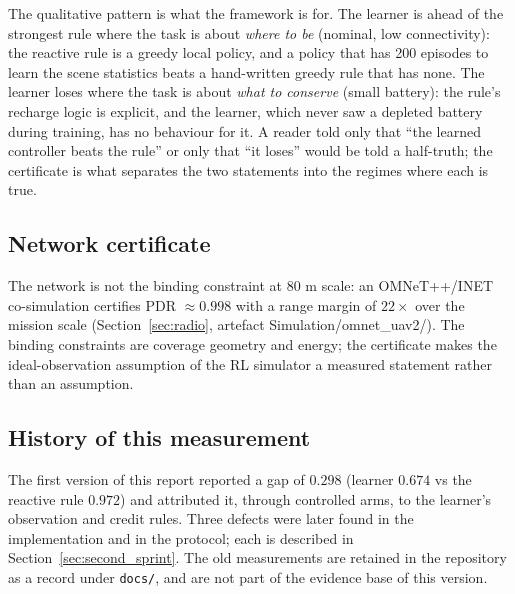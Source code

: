 The qualitative pattern is what the framework is for.  The learner is ahead
of the strongest rule where the task is about \emph{where to be} (nominal,
low connectivity): the reactive rule is a greedy local policy, and a policy
that has 200 episodes to learn the scene statistics beats a hand-written
greedy rule that has none.  The learner loses where the task is about
\emph{what to conserve} (small battery): the rule's recharge logic is
explicit, and the learner, which never saw a depleted battery during
training, has no behaviour for it.  A reader told only that ``the learned
controller beats the rule'' or only that ``it loses'' would be told a
half-truth; the certificate is what separates the two statements into the
regimes where each is true.

\subsection{Network certificate}
\label{sec:results_network}

The network is not the binding constraint at 80 m scale: an OMNeT++/INET
co-simulation certifies PDR $\approx 0.998$ with a range margin of $22\times$
over the mission scale (Section~\ref{sec:radio}, artefact
Simulation/omnet_uav2/).  The binding constraints are coverage geometry and
energy; the certificate makes the ideal-observation assumption of the RL
simulator a measured statement rather than an assumption.

\subsection{History of this measurement}
\label{sec:history}

The first version of this report reported a gap of $0.298$ (learner $0.674$
vs the reactive rule $0.972$) and attributed it, through controlled arms, to
the learner's observation and credit rules.  Three defects were later found
in the implementation and in the protocol; each is described in
Section~\ref{sec:second_sprint}.  The old measurements are retained in the
repository as a record under \texttt{docs/}, and are not part of the evidence
base of this version.